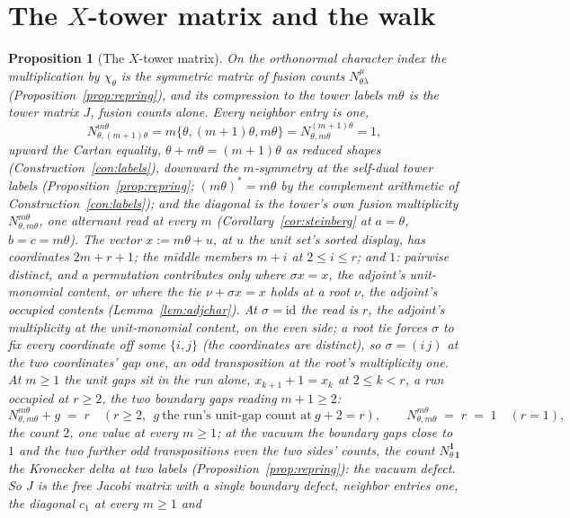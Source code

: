 \documentclass[11pt]{article}
\newtheorem{proposition}{Proposition}
\theoremstyle{definition}
\begin{document}
\section{The $X$-tower matrix and the walk}

\begin{proposition}[The $X$-tower matrix]\label{prop:row}
On the orthonormal character index the multiplication by $\chi_\theta$
is the symmetric matrix of fusion counts $N^\mu_{\theta\lambda}$
(Proposition~\ref{prop:repring}), and
its compression to the tower labels $m\theta$ is the \emph{tower
matrix} $J$, fusion counts alone. Every neighbor entry is one,
\[
N^{m\theta}_{\theta,(m+1)\theta}
=m\{\theta,(m{+}1)\theta,m\theta\}
=N^{(m+1)\theta}_{\theta,m\theta}
=1 ,
\]
upward the Cartan equality, $\theta+m\theta=(m{+}1)\theta$ as
reduced shapes (Construction~\ref{con:labels}), downward the
$m$-symmetry at the self-dual tower labels
(Proposition~\ref{prop:repring}; $(m\theta)^*=m\theta$ by the complement
arithmetic of Construction~\ref{con:labels}); and the diagonal is the
tower's own fusion multiplicity
$N^{m\theta}_{\theta,m\theta}$, one alternant read at
every $m$ (Corollary~\ref{cor:steinberg} at $a=\theta$, $b=c=m\theta$).
The vector $x:=m\theta+u$, at $u$ the unit set's sorted display, has
coordinates $2m+r+1$; the middle members $m+i$ at
$2\le i\le r$; and $1$: pairwise distinct, and a permutation
contributes only where $\sigma x=x$, the adjoint's unit-monomial content, or
where the tie $\nu+\sigma x=x$ holds at a root $\nu$, the adjoint's
occupied contents (Lemma~\ref{lem:adjchar}). At $\sigma=\mathrm{id}$ the
read is $r$, the adjoint's multiplicity at the unit-monomial
content, on the even side; a root tie
forces $\sigma$ to fix every coordinate off some $\{i,j\}$ (the
coordinates
are distinct), so $\sigma=(i\,j)$ at the two coordinates' gap one, an
odd transposition at the root's multiplicity one. At
$m\ge1$ the unit gaps sit in the run alone, $x_{k+1}+1=x_k$ at
$2\le k<r$, a run occupied at $r\ge2$, the two boundary
gaps reading $m+1\ge2$:
\[
N^{m\theta}_{\theta,m\theta}+g\;=\;r\quad(r\ge2,\ \ g\ \text{the
run's unit-gap count at}\ g+2=r),
\qquad
N^{m\theta}_{\theta,m\theta}\;=\;r\;=\;1\quad(r=1),
\]
the count $2$, one value at every $m\ge1$; at the vacuum the boundary
gaps close to $1$ and the two further odd transpositions even the
two sides' counts, the count $N^{\mathbf 1}_{\theta\,\mathbf 1}$ the
Kronecker delta at two labels (Proposition~\ref{prop:repring}): the
vacuum defect. So $J$ is the free Jacobi matrix with a single boundary
defect, neighbor entries one, the diagonal $c_1$ at every $m\ge1$ and

\end{proposition}
\end{document}
